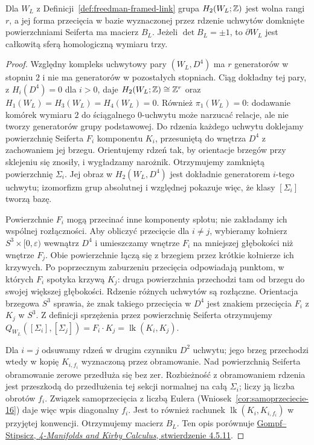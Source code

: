 \begin{stwierdzenie}
\label{prop:freedman-link-matrix}
Dla $W_L$ z Definicji~\ref{def:freedman-framed-link}
grupa $H_2(W_L;\mathbb{Z})$ jest wolna rangi $r$, a jej
forma przecięcia w bazie wyznaczonej przez rdzenie
uchwytów domknięte powierzchniami Seiferta ma macierz $B_L$.
Jeżeli $\det B_L=\pm1$, to $\partial W_L$ jest
całkowitą sferą homologiczną wymiaru trzy.
\end{stwierdzenie}
\begin{proof}
Względny kompleks uchwytowy pary $(W_L,D^4)$ ma
$r$ generatorów w stopniu $2$ i nie ma generatorów
w pozostałych stopniach. Ciąg dokładny tej pary,
z $H_i(D^4)=0$ dla $i>0$, daje
$H_2(W_L;\mathbb{Z})\cong\mathbb{Z}^r$ oraz
$H_1(W_L)=H_3(W_L)=H_4(W_L)=0$.
Również $\pi_1(W_L)=0$: dodawanie komórek wymiaru
$2$ do ściągalnego $0$-uchwytu może narzucać relacje,
ale nie tworzy generatorów grupy podstawowej.
Do rdzenia każdego uchwytu doklejamy powierzchnię
Seiferta $F_i$ komponentu $K_i$, przesuniętą do
wnętrza $D^4$ z zachowaniem jej brzegu. Orientujemy
rdzeń tak, by orientacje brzegów przy sklejeniu się znosiły,
i wygładzamy narożnik. Otrzymujemy zamkniętą powierzchnię
$\Sigma_i$. Jej obraz w $H_2(W_L,D^4)$ jest dokładnie
generatorem $i$-tego uchwytu; izomorfizm grup absolutnej
i względnej pokazuje więc, że klasy $[\Sigma_i]$ tworzą bazę.

Powierzchnie $F_i$ mogą przecinać inne komponenty splotu;
nie zakładamy ich wspólnej rozłączności. Aby obliczyć
przecięcie dla $i\ne j$, wybieramy kołnierz $S^3\times[0,\varepsilon)$
wewnątrz $D^4$ i umieszczamy wnętrze $F_i$ na mniejszej
głębokości niż wnętrze $F_j$. Obie powierzchnie łączą
się z brzegiem przez krótkie kołnierze ich krzywych.
Po poprzecznym zaburzeniu przecięcia odpowiadają
punktom, w których $F_i$ spotyka krzywą $K_j$:
druga powierzchnia przechodzi tam od brzegu do swojej
większej głębokości. Rdzenie różnych uchwytów są rozłączne.
Orientacja brzegowa $S^3$ sprawia, że znak takiego
przecięcia w $D^4$ jest znakiem przecięcia $F_i$ z $K_j$
w $S^3$. Z definicji sprzężenia przez powierzchnię Seiferta
otrzymujemy $Q_{W_L}([\Sigma_i],[\Sigma_j])=
F_i\cdot K_j=\operatorname{lk}(K_i,K_j)$.

Dla $i=j$ odsuwamy rdzeń w drugim czynniku $D^2$
uchwytu; jego brzeg przechodzi wtedy w kopię $K_{i,f_i}$
wyznaczoną przez obramowanie. Nad powierzchnią Seiferta
obramowanie zerowe przedłuża się bez zer. Rozbieżność
z obramowaniem rdzenia jest przeszkodą do przedłużenia
tej sekcji normalnej na całą $\Sigma_i$; liczy ją liczba
obrotów $f_i$. Związek samoprzecięcia z liczbą Eulera
(Wniosek~\ref{cor:samoprzeciecie-16}) daje więc wpis
diagonalny $f_i$. Jest to również rachunek
$\operatorname{lk}(K_i,K_{i,f_i})$ w przyjętej konwencji.
Otrzymujemy macierz $B_L$. Ten opis porównuje
\href{https://poisson.phc.dm.unipi.it/~camponovo/libri/%28Graduate%20Studies%20in%20Mathematics%2020%29%20Andras%20I.%20Stipsicz%20Robert%20E.%20Gompf%20-%204-Manifolds%20and%20Kirby%20Calculus-American%20Mathematical%20Society%20%281999%29.pdf}
{Gompf--Stipsicz, \emph{4-Manifolds and Kirby Calculus},
stwierdzenie 4.5.11}.


\end{proof}
